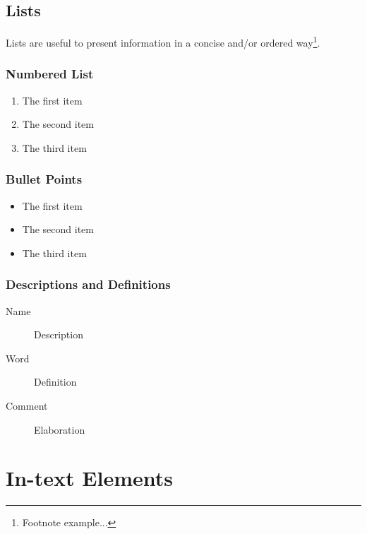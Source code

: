 \documentclass[11pt,fleqn]{book} %
\begin{document}

\section{Lists}

Lists are useful to present information in a concise and/or ordered way\footnote{Footnote example...}.

\subsection{Numbered List}

\begin{enumerate}
\item The first item
\item The second item
\item The third item
\end{enumerate}

\subsection{Bullet Points}

\begin{itemize}
\item The first item
\item The second item
\item The third item
\end{itemize}

\subsection{Descriptions and Definitions}

\begin{description}
\item[Name] Description
\item[Word] Definition
\item[Comment] Elaboration
\end{description}


\chapter{In-text Elements}
\end{document}
